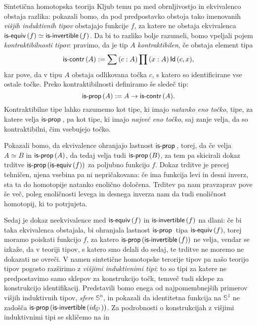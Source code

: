 \documentclass[a4paper, slovene]{article}
\begin{document}
\begin{section}{Sintetična homotopska teorija}
  Kljub temu pa med obrnljivostjo in ekvivalenco obstaja
  razlika: pokazali bomo, da pod predpostavko obstoja tako imenovanih
  \emph{višjih induktivnih tipov} obstajajo funkcije \(f\), za katere ne obstaja
  ekvivalenca \(\textnormal{\textsf{is-equiv}}\,(f) \simeq \textnormal{\textsf{is-invertible}}\,(f)\). Da bi to razliko bolje razumeli, bomo vpeljali
  pojem \emph{kontraktibilnosti tipov}: pravimo, da je tip \(A\) \emph{kontraktibilen},
  če obstaja element tipa
  \[\textnormal{\textsf{is-contr}}\,(A) := \sum \left( c : A \right) \prod \left( x : A \right) \textnormal{\textsf{Id}}\,(c, x),\]
  kar pove, da v tipu \(A\) obstaja odlikovana točka \(c\), s katero so identificirane
  vse ostale točke.
  Preko kontraktibilnosti definiramo še sledeč tip:
  \[\textnormal{\textsf{is-prop}}\,(A) := A \to \textnormal{\textsf{is-contr}}\,(A).\]
  Kontraktibilne tipe lahko razumemo kot tipe, ki imajo \emph{natanko eno točko},
  tipe, za katere velja \(\textnormal{\textsf{is-prop}}\,\), pa kot tipe, ki imajo \emph{največ eno točko}, saj
  zanje velja, da so kontraktibilni, čim vsebujejo točko.

  Pokazali bomo, da ekvivalence ohranjajo lastnost \(\textnormal{\textsf{is-prop}}\,\), torej, da
  če velja \(A \simeq B\) in \(\textnormal{\textsf{is-prop}}\,(A)\), da tedaj velja tudi \(\textnormal{\textsf{is-prop}}\,(B)\), za tem
  pa skicirali dokaz trditve \(\textnormal{\textsf{is-prop}}\,(\textnormal{\textsf{is-equiv}}\,(f))\) za poljubno funkcijo \(f\).
  Dokaz trditve je precej tehničen, njena vsebina pa ni nepričakovana:
  če ima funkcija levi in desni inverz, sta ta do homotopije natanko enolično določena.
  Trditev pa nam pravzaprav pove še več,
  poleg enoličnosti levega in desnega inverza nam da tudi enoličnost homotopij, ki to
  potrjujeta.

  Sedaj je dokaz neekvivalence med \(\textnormal{\textsf{is-equiv}}\,(f)\) in \(\textnormal{\textsf{is-invertible}}\,(f)\) na dlani: če bi taka
  ekvivalenca obstajala, bi ohranjala lastnost \(\textnormal{\textsf{is-prop}}\,\) tipa \(\textnormal{\textsf{is-equiv}}\,(f)\), torej
  moramo poiskati funkcijo \(f\), za katero \(\textnormal{\textsf{is-prop}}\,(\textnormal{\textsf{is-invertible}}\,(f))\) ne velja, vendar se
  izkaže, da v teoriji tipov, s katero smo delali do sedaj, te trditve ne moremo ne
  dokazati ne ovreči. V namen sintetične homotopske terorije tipov pa našo teorijo tipov
  pogosto razširimo z \emph{višjimi induktivnimi tipi}: to so tipi za katere ne
  predpostavimo samo sklepov za konstrukcijo točk, temveč tudi sklepe za konstrukcijo
  identifikacij. Predstavili bomo enega od najpomembnejših primerov višjih induktivnih
  tipov, \emph{sfere} \(\mathbb{S}^{n}\), in pokazali da identitetna funkcija
  na \(\mathbb{S}^{1}\) ne zadošča \(\textnormal{\textsf{is-prop}}\,(\textnormal{\textsf{is-invertible}}\,(id_{\mathbb{S}^{1}}))\). Za
  podrobnosti o konstrukcijah z višjimi induktivnimi tipi se skličemo na
  \cite{hottbook} in \cite{ljungström2024symmetric}
\end{section}
\end{document}
